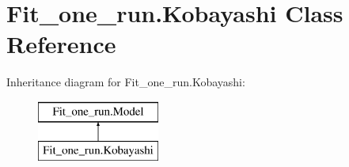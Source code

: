 \hypertarget{classFit__one__run_1_1Kobayashi}{\section{\-Fit\-\_\-one\-\_\-run.\-Kobayashi \-Class \-Reference}
\label{classFit__one__run_1_1Kobayashi}
}
\-Inheritance diagram for \-Fit\-\_\-one\-\_\-run.\-Kobayashi\-:\begin{figure}[H]
\begin{center}
\leavevmode
\includegraphics[height=2.000000cm]{classFit__one__run_1_1Kobayashi}
\end{center}
\end{figure}
